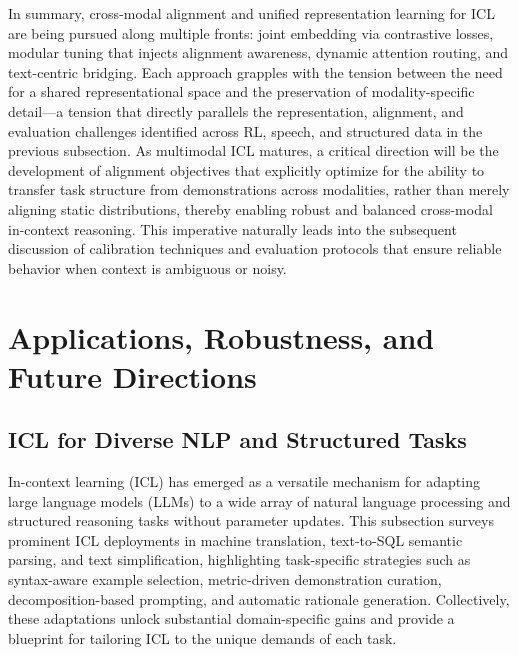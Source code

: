 \documentclass[11pt]{article}
\begin{document}
In summary, cross-modal alignment and unified representation learning for ICL are being pursued along multiple fronts: joint embedding via contrastive losses, modular tuning that injects alignment awareness, dynamic attention routing, and text-centric bridging. Each approach grapples with the tension between the need for a shared representational space and the preservation of modality-specific detail---a tension that directly parallels the representation, alignment, and evaluation challenges identified across RL, speech, and structured data in the previous subsection. As multimodal ICL matures, a critical direction will be the development of alignment objectives that explicitly optimize for the ability to transfer task structure from demonstrations across modalities, rather than merely aligning static distributions, thereby enabling robust and balanced cross-modal in-context reasoning. This imperative naturally leads into the subsequent discussion of calibration techniques and evaluation protocols that ensure reliable behavior when context is ambiguous or noisy.

\section{Applications, Robustness, and Future Directions}

\subsection{ICL for Diverse NLP and Structured Tasks}

In-context learning (ICL) has emerged as a versatile mechanism for adapting large language models (LLMs) to a wide array of natural language processing and structured reasoning tasks without parameter updates. This subsection surveys prominent ICL deployments in machine translation, text-to-SQL semantic parsing, and text simplification, highlighting task-specific strategies such as syntax-aware example selection, metric-driven demonstration curation, decomposition-based prompting, and automatic rationale generation. Collectively, these adaptations unlock substantial domain-specific gains and provide a blueprint for tailoring ICL to the unique demands of each task.
\end{document}

